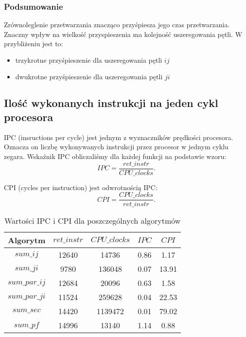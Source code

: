 \subsubsection{Podsumowanie}

Zrównoleglenie przetwarzania znacząco przyśpiesza jego czas przetwarzania. Znaczny wpływ na wielkość przyspieszenia ma kolejność uszeregowania pętli. W przybliżeniu jest to:
\begin{itemize}
\item trzykrotne przyśpieszenie dla uszeregowania pętli $ij$
\item dwukrotne przyśpieszenie dla uszeregowania pętli $ji$
\end{itemize}

\subsection{Ilość wykonanych instrukcji na jeden cykl procesora}

IPC (insructions per cycle) jest jednym z wyznaczników prędkości procesora. Oznacza on liczbę wykonywanych instrukcji przez procesor w jednym cyklu zegara. Wskaźnik IPC obliczaliśmy dla każdej funkcji na podstawie wzoru:
\begin{equation}
  IPC = \frac{ret\_instr}{CPU\_clocks}.
\end{equation}

CPI (cycles per instruction) jest odwrotnością IPC:
\begin{equation}
  CPI = \frac{CPU\_clocks}{ret\_instr}.
\end{equation}

\begin{table}[H]
\centering
\begin{tabular}{|c|c|c|c|c|}
\hline
Algorytm & $ret\_instr$ & $CPU\_clocks$ & $IPC$ & $CPI$ \\ \hline
$sum\_ij$ & 12640 & 14736 & 0.86 & 1.17 \\ \hline
$sum\_ji$ & 9780 & 136048 & 0.07 & 13.91 \\ \hline
$sum\_par\_ij$ & 12684 & 20096 & 0.63 & 1.58 \\ \hline
$sum\_par\_ji$ & 11524 & 259628 & 0.04 & 22.53 \\ \hline
$sum\_sec$ & 14420 & 1139472 & 0.01 & 79.02 \\ \hline
$sum\_pf$ & 14996 & 13140 & 1.14 & 0.88 \\ \hline
\end{tabular}
\caption{Wartości IPC i CPI dla poszczególnych algorytmów}
\end{table}


